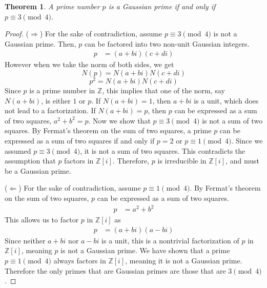 \documentclass{article}
\theoremstyle{plain} %
\newtheorem{theorem}{Theorem}
\theoremstyle{definition} %
\begin{document}
\begin{theorem}
    A prime number $p$ is a Gaussian prime if and only if $p \equiv 3 \pmod{4}$.
\end{theorem}
\begin{proof}
    ($\Rightarrow$)
    For the sake of contradiction, assume $p \equiv 3 \pmod{4}$ is not a Gaussian prime.
    Then, $p$ can be factored into two non-unit Gaussian integers.
    \begin{align*}
        p &= (a + bi)(c + di)
    \end{align*}
    However when we take the norm of both sides, we get
    \[
        N(p) = N(a + bi)N(c + di)
    \]
    \[
        p^2 = N(a + bi)N(c + di)
    \]
    Since $p$ is a prime number in $\mathbb{Z}$, this implies that one of the norm, say $N(a + bi)$, is either $1$ or $p$.
    If $N(a + bi) = 1$, then $a + bi$ is a unit, which does not lead to a factorization.
    If $N(a + bi) = p$, then $p$ can be expressed as a sum of two squares, $a^2 + b^2 = p$.
    Now we show that $p \equiv 3 \pmod{4}$ is not a sum of two squares.
    By Fermat's theorem on the sum of two squares, a prime $p$ can be expressed as a sum of two squares if and only if $p = 2$ or $p \equiv 1 \pmod{4}$.
    Since we assumed $p \equiv 3 \pmod{4}$, it is not a sum of two squares.
    This contradicts the assumption that $p$ factors in $\mathbb{Z}[i]$.
    Therefore, $p$ is irreducible in $\mathbb{Z}[i]$, and must be a Gaussian prime.

    ($\Leftarrow$)
    For the sake of contradiction, assume $p \equiv 1 \pmod{4}$.
    By Fermat's theorem on the sum of two squares, $p$ can be expressed as a sum of two squares.
    \begin{align*}
        p &= a^2 + b^2
    \end{align*}
    This allows us to factor $p$ in $\mathbb{Z}[i]$ as
    \begin{align*}
        p &= (a + bi)(a - bi)
    \end{align*}
    Since neither $a + bi$ nor $a - bi$ is a unit, this is a nontrivial
    factorization of $p$ in $\mathbb{Z}[i]$, meaning $p$ is not a Gaussian prime.
    We have shown that a prime $p \equiv 1 \pmod{4}$ always factors in $\mathbb{Z}[i]$, meaning it is not a Gaussian prime.
    Therefore the only primes that are Gaussian primes are those that are $3 \pmod{4}$.
\end{proof}
\end{document}
